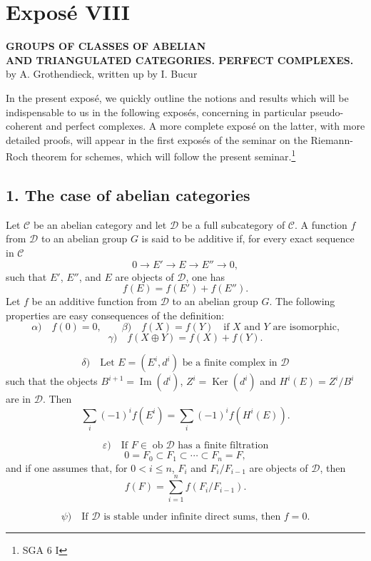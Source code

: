 \documentclass[11pt]{article}
\providecommand{\Ob}{\operatorname{ob}}
\providecommand{\cC}{\mathcal C}
\providecommand{\Ob}{\operatorname{ob}}
\providecommand{\cC}{\mathcal C}
\providecommand{\cD}{\mathcal D}
\providecommand{\Ob}{\operatorname{Ob}}
\begin{document}
\newpage
\section*{Exposé VIII}

\begin{center}
\textbf{GROUPS OF CLASSES OF ABELIAN}\\
\textbf{AND TRIANGULATED CATEGORIES. PERFECT COMPLEXES.}\\[1ex]
by A. Grothendieck, written up by I. Bucur
\end{center}

In the present exposé, we quickly outline the notions and results which will be indispensable to us in the following exposés, concerning in particular pseudo-coherent and perfect complexes. A more complete exposé on the latter, with more detailed proofs, will appear in the first exposés of the seminar on the Riemann-Roch theorem for schemes, which will follow the present seminar.\footnote{SGA 6 I}

\subsection*{1. The case of abelian categories}

Let $\cC$ be an abelian category and let $\cD$ be a full subcategory of $\cC$. A function $f$ from $\cD$ to an abelian group $G$ is said to be additive if, for every exact sequence in $\cC$
\[
0\longrightarrow E'\longrightarrow E\longrightarrow E''\longrightarrow 0,
\]
such that $E'$, $E''$, and $E$ are objects of $\cD$, one has
\[
f(E)=f(E')+f(E'').
\]
Let $f$ be an additive function from $\cD$ to an abelian group $G$. The following properties are easy consequences of the definition:
\[
\alpha)\quad f(0)=0,\qquad
\beta)\quad f(X)=f(Y)\quad\text{if }X\text{ and }Y\text{ are isomorphic,}
\]
\[
\gamma)\quad f(X\oplus Y)=f(X)+f(Y).
\]

\[
\delta)\quad
\text{Let }E=(E^i,d^i)\text{ be a finite complex in }\cD
\]
such that the objects $B^{i+1}=\operatorname{Im}(d^i)$, $Z^i=\operatorname{Ker}(d^i)$ and $H^i(E)=Z^i/B^i$ are in $\cD$. Then
\[
\sum_i (-1)^i f(E^i)=\sum_i (-1)^i f(H^i(E)).
\]

\[
\varepsilon)\quad
\text{If }F\in\Ob \cD\text{ has a finite filtration}
\]
\[
0=F_0\subset F_1\subset\cdots\subset F_n=F,
\]
and if one assumes that, for $0<i\le n$, $F_i$ and $F_i/F_{i-1}$ are objects of $\cD$, then
\[
f(F)=\sum_{i=1}^n f(F_i/F_{i-1}).
\]

\[
\psi)\quad
\text{If }\cD\text{ is stable under infinite direct sums, then }f=0.
\]
\end{document}
